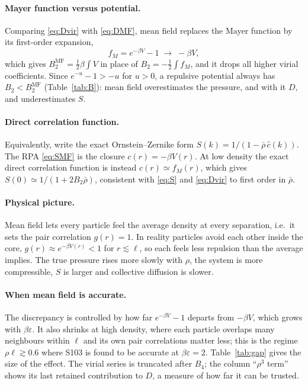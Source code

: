 \documentclass[11pt]{article}
\newcommand{\MF}{\mathrm{MF}}
\begin{document}
\paragraph{Mayer function versus potential.} Comparing \eqref{eq:Dvir} with
\eqref{eq:DMF}, mean field replaces the Mayer function by its first-order
expansion,
\begin{equation}
  f_M = e^{-\beta V}-1 \;\longrightarrow\; -\beta V,
\end{equation}
which gives $B_2^\MF = \tfrac12\beta\int V$ in place of
$B_2 = -\tfrac12\int f_M$, and it drops all higher virial coefficients. Since
$e^{-u}-1 > -u$ for $u>0$, a repulsive potential always has $B_2 < B_2^\MF$
(Table~\ref{tab:B}): mean field overestimates the pressure, and with it $D$,
and underestimates $S$.

\paragraph{Direct correlation function.} Equivalently, write the exact
Ornstein--Zernike form $S(k) = 1/(1-\bar\rho\,\hat c(k))$. The RPA
\eqref{eq:SMF} is the closure $c(r) = -\beta V(r)$. At low density the exact
direct correlation function is instead $c(r)\simeq f_M(r)$, which gives
$S(0)\simeq 1/(1+2B_2\bar\rho)$, consistent with \eqref{eq:S} and
\eqref{eq:Dvir} to first order in $\bar\rho$.

\paragraph{Physical picture.} Mean field lets every particle feel the average
density at every separation, i.e.\ it sets the pair correlation $g(r)=1$.
In reality particles avoid each other inside the core, $g(r)\approx
e^{-\beta V(r)}<1$ for $r\lesssim\ell$, so each feels less repulsion than the
average implies. The true pressure rises more slowly with $\rho$, the system
is more compressible, $S$ is larger and collective diffusion is slower.

\paragraph{When mean field is accurate.} The discrepancy is controlled by how
far $e^{-\beta V}-1$ departs from $-\beta V$, which grows with $\beta\varepsilon$.
It also shrinks at high density, where each particle overlaps many
neighbours within $\ell$ and its own pair correlations matter less; this is
the regime $\rho\ell\gtrsim 0.6$ where S103 is found to be accurate at
$\beta\varepsilon=2$. Table~\ref{tab:gap} gives the size of the effect. The
virial series is truncated after $B_4$; the column ``$\rho^3$ term'' shows its
last retained contribution to $D$, a measure of how far it can be trusted.
\end{document}
